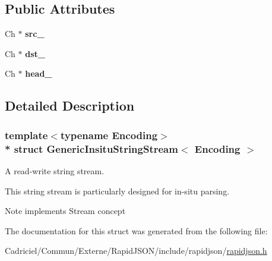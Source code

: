 \subsection*{Public Attributes}
\begin{DoxyCompactItemize}
\item 
Ch $\ast$ {\bfseries src\+\_\+}\hypertarget{struct_generic_insitu_string_stream_af3cc551dd07fcca39db84459f4d4e718}{}\label{struct_generic_insitu_string_stream_af3cc551dd07fcca39db84459f4d4e718}

\item 
Ch $\ast$ {\bfseries dst\+\_\+}\hypertarget{struct_generic_insitu_string_stream_ab0e7a73638a7a8db81aa9b26714b0e3b}{}\label{struct_generic_insitu_string_stream_ab0e7a73638a7a8db81aa9b26714b0e3b}

\item 
Ch $\ast$ {\bfseries head\+\_\+}\hypertarget{struct_generic_insitu_string_stream_af5a7116bdd9bfde5141c298a5b7566b0}{}\label{struct_generic_insitu_string_stream_af5a7116bdd9bfde5141c298a5b7566b0}

\end{DoxyCompactItemize}


\subsection{Detailed Description}
\subsubsection*{template$<$typename Encoding$>$\\*
struct Generic\+Insitu\+String\+Stream$<$ Encoding $>$}

A read-\/write string stream. 

This string stream is particularly designed for in-\/situ parsing. \begin{DoxyNote}{Note}
implements Stream concept 
\end{DoxyNote}


The documentation for this struct was generated from the following file\+:\begin{DoxyCompactItemize}
\item 
Cadriciel/\+Commun/\+Externe/\+Rapid\+J\+S\+O\+N/include/rapidjson/\hyperlink{rapidjson_8h}{rapidjson.\+h}\end{DoxyCompactItemize}
